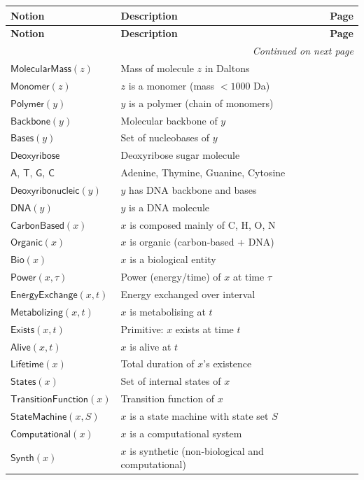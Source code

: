 \documentclass{amsart}
\newenvironment{notiontable}{%
	\renewcommand{\arraystretch}{1.2}%
	\setlength{\tabcolsep}{4pt}%
	\begin{longtable}{|l|l|c|}
		\hline
		\textbf{Notion} & \textbf{Description} & \textbf{Page} \\
		\hline
		\endfirsthead
		\hline
		\textbf{Notion} & \textbf{Description} & \textbf{Page} \\
		\hline
		\endhead
		\hline
		\multicolumn{3}{r}{\textit{Continued on next page}} \\
		\endfoot
		\hline
		\endlastfoot
	}{%
	\end{longtable}%
}
\theoremstyle{break}
\newcommand{\IsBiological}[1]{\mathsf{Bio}(#1)}
\newcommand{\IsSynthetic}[1]{\mathsf{Synth}(#1)}
\begin{document}
\begin{notiontable}
	$\mathsf{MolecularMass}(z)$ & Mass of molecule $z$ in Daltons & \pageref{def:molecularmass} \\
	$\mathsf{Monomer}(z)$ & $z$ is a monomer (mass $<1000$ Da) & \pageref{def:monomer} \\
	$\mathsf{Polymer}(y)$ & $y$ is a polymer (chain of monomers) & \pageref{def:polymer} \\
	$\mathsf{Backbone}(y)$ & Molecular backbone of $y$ & \pageref{def:backbone} \\
	$\mathsf{Bases}(y)$ & Set of nucleobases of $y$ & \pageref{def:bases} \\
	$\mathsf{Deoxyribose}$ & Deoxyribose sugar molecule & \pageref{def:deoxyribose} \\
	$\mathsf{A}$, $\mathsf{T}$, $\mathsf{G}$, $\mathsf{C}$ & Adenine, Thymine, Guanine, Cytosine & \pageref{def:adenine} \\
	$\mathsf{Deoxyribonucleic}(y)$ & $y$ has DNA backbone and bases & \pageref{def:deoxyribonucleic} \\
	$\mathsf{DNA}(y)$ & $y$ is a DNA molecule & \pageref{def:dna} \\
	
	$\mathsf{CarbonBased}(x)$ & $x$ is composed mainly of C, H, O, N & \pageref{def:carbonbased} \\
	$\mathsf{Organic}(x)$ & $x$ is organic (carbon‑based + DNA) & \pageref{def:organic} \\
	$\IsBiological{x}$ & $x$ is a biological entity & \pageref{def:bio} \\
	
	$\mathsf{Power}(x,\tau)$ & Power (energy/time) of $x$ at time $\tau$ & \pageref{def:power} \\
	$\mathsf{EnergyExchange}(x,t)$ & Energy exchanged over interval & \pageref{def:energyexchange} \\
	$\mathsf{Metabolizing}(x,t)$ & $x$ is metabolising at $t$ & \pageref{def:metabolizing} \\
	$\mathsf{Exists}(x,t)$ & Primitive: $x$ exists at time $t$ & \pageref{def:exists} \\
	$\mathsf{Alive}(x,t)$ & $x$ is alive at $t$ & \pageref{def:alive} \\
	$\mathsf{Lifetime}(x)$ & Total duration of $x$'s existence & \pageref{def:lifetime} \\
	
	$\mathsf{States}(x)$ & Set of internal states of $x$ & \pageref{def:states} \\
	$\mathsf{TransitionFunction}(x)$ & Transition function of $x$ & \pageref{def:transitionfunction} \\
	$\mathsf{StateMachine}(x,S)$ & $x$ is a state machine with state set $S$ & \pageref{def:statemachine} \\
	$\mathsf{Computational}(x)$ & $x$ is a computational system & \pageref{def:computational} \\
	$\IsSynthetic{x}$ & $x$ is synthetic (non‑biological and computational) & \pageref{def:synth} \\
	

\end{notiontable}
\end{document}
